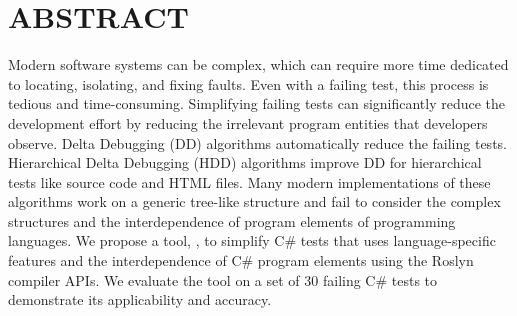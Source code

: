
\chapter*{ABSTRACT}
\vspace{7mm}

Modern software systems can be complex, which can require more time dedicated to locating, isolating, and fixing faults. Even with a failing test, this process is tedious and time-consuming. Simplifying failing tests can significantly reduce the development effort by reducing the irrelevant program entities that developers observe. Delta Debugging (DD) algorithms automatically reduce the failing tests. Hierarchical Delta Debugging (HDD) algorithms improve DD for hierarchical tests like source code and HTML files. Many modern implementations of these algorithms work on a generic tree-like structure and fail to consider the complex structures and the interdependence of program elements of programming languages. We propose a tool, \mytool, to simplify C\# tests that uses language-specific features and the interdependence of C\# program elements using the Roslyn compiler APIs. We evaluate the tool on a set of 30 failing C\# tests to demonstrate its applicability and accuracy.     

 